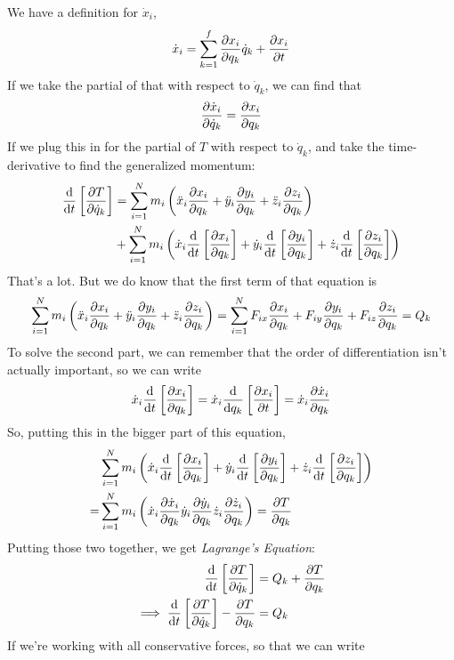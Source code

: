 \documentclass[a4paper]{article}
\begin{document}
We have a definition for $\dot{x}_i$,
\[ \dot{x}_i = \sum_{k=1}^f \frac{\partial x_i}{\partial q_k}\dot{q}_k + \frac{\partial x_i}{\partial t} \]
If we take the partial of that with respect to $\dot{q}_k$, we can find that
\[ \frac{\partial \dot{x}_i}{\partial \dot{q}_k} = \frac{\partial x_i}{\partial q_k} \]
If we plug this in for the partial of $T$ with respect to
$\dot{q}_k$, and take the time-derivative to find the generalized momentum:
\begin{align*}
	\frac{\mathrm{d}}{\mathrm{d} t}\left[\frac{\partial T}{\partial \dot{q}_k}\right] &=
		\sum_{i=1}^N m_i\left(
			\ddot{x}_i\frac{\partial x_i}{\partial q_k}+
			\ddot{y}_i\frac{\partial y_i}{\partial q_k}+
			\ddot{z}_i\frac{\partial z_i}{\partial q_k}\right)\\
			&+\sum_{i=1}^Nm_i\left(
			\dot{x}_i\frac{\mathrm{d}}{\mathrm{d} t}\left[\frac{\partial x_i}{\partial q_k}\right]+
			\dot{y}_i\frac{\mathrm{d}}{\mathrm{d} t}\left[\frac{\partial y_i}{\partial q_k}\right]+
			\dot{z}_i\frac{\mathrm{d}}{\mathrm{d} t}\left[\frac{\partial z_i}{\partial q_k}\right]
		\right)
\end{align*}
That's a lot. But we do know that the first term of that equation is
\begin{align*}
	\sum_{i=1}^N m_i\left(
		\ddot{x}_i\frac{\partial x_i}{\partial q_k}+
		\ddot{y}_i\frac{\partial y_i}{\partial q_k}+
		\ddot{z}_i\frac{\partial z_i}{\partial q_k}\right)
	=\sum_{i=1}^N
		F_{ix}\frac{\partial x_i}{\partial q_k}+F_{iy}\frac{\partial y_i}{\partial q_k}+
			F_{iz}\frac{\partial z_i}{\partial q_k} = Q_k
\end{align*}
To solve the second part, we can remember that the order of differentiation
isn't actually important, so we can write
\begin{align*}
	\dot{x}_i\frac{\mathrm{d}}{\mathrm{d} t}\left[\frac{\partial x_i}{\partial q_k}\right] =
	\dot{x}_i\frac{\mathrm{d}}{\mathrm{d} q_k}\left[\frac{\partial x_i}{\partial t}\right] =
	\dot{x}_i\frac{\partial \dot{x}_i}{\partial q_k}
\end{align*}
So, putting this in the bigger part of this equation,
\begin{align*}
	&\sum_{i=1}^Nm_i\left(
	\dot{x}_i\frac{\mathrm{d}}{\mathrm{d} t}\left[\frac{\partial x_i}{\partial q_k}\right]+
	\dot{y}_i\frac{\mathrm{d}}{\mathrm{d} t}\left[\frac{\partial y_i}{\partial q_k}\right]+
	\dot{z}_i\frac{\mathrm{d}}{\mathrm{d} t}\left[\frac{\partial z_i}{\partial q_k}\right]\right)\\
	=&\sum_{i=1}^Nm_i\left(
	\dot{x}_i\frac{\partial \dot{x}_i}{\partial q_k}
	\dot{y}_i\frac{\partial \dot{y}_i}{\partial q_k}
	\dot{z}_i\frac{\partial \dot{z}_i}{\partial q_k}
	\right) = \frac{\partial T}{\partial q_k}
\end{align*}
Putting those two together, we get \emph{Lagrange's Equation}:
\begin{align*}
	\frac{\mathrm{d}}{\mathrm{d} t}\left[\frac{\partial T}{\partial \dot{q}_k}\right] &= Q_k+\frac{\partial T}{\partial q_k}\\
	\implies 
	\frac{\mathrm{d}}{\mathrm{d} t}\left[\frac{\partial T}{\partial \dot{q}_k}\right]-\frac{\partial T}{\partial q_k} &= Q_k
\end{align*}
If we're working with all conservative forces, so that we can write
\end{document}
